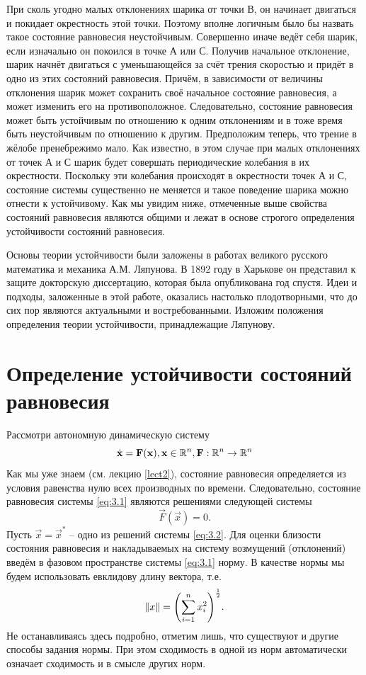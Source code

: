 При сколь угодно малых отклонениях шарика от точки В, он начинает
двигаться и покидает окрестность этой точки. Поэтому вполне логичным было
бы назвать такое состояние равновесия неустойчивым. Совершенно иначе ведёт
себя шарик, если изначально он покоился в точке А или С. Получив начальное
отклонение, шарик начнёт двигаться с уменьшающейся за счёт трения
скоростью и придёт в одно из этих состояний равновесия. Причём, в
зависимости от величины отклонения шарик может сохранить своё начальное
состояние равновесия, а может изменить его на противоположное.
Следовательно, состояние равновесия может быть устойчивым по отношению к
одним отклонениям и в тоже время быть неустойчивым по отношению к
другим. Предположим теперь, что трение в жёлобе пренебрежимо мало. Как
известно, в этом случае при малых отклонениях от точек А и С шарик будет
совершать периодические колебания в их окрестности. Поскольку эти
колебания происходят в окрестности точек А и С, состояние системы
существенно не меняется и такое поведение шарика можно отнести к
устойчивому. Как мы увидим ниже, отмеченные выше свойства состояний
равновесия являются общими и лежат в основе строгого определения
устойчивости состояний равновесия.

Основы теории устойчивости были заложены в работах великого
русского математика и механика А.М. Ляпунова. В 1892 году в Харькове он
представил к защите докторскую диссертацию, которая была опубликована год
спустя. Идеи и подходы, заложенные в этой работе, оказались настолько
плодотворными, что до сих пор являются актуальными и востребованными.
Изложим положения определения теории устойчивости, принадлежащие
Ляпунову.

\section{Определение устойчивости состояний равновесия}%


Рассмотри автономную динамическую систему
\begin{equation}
    \label{eq:3.1}
    \dot {\mathbf{x}} =  \mathbf{F}(\mathbf{x}), \mathbf{x} \in \mathbb{R}^n,   \mathbf{F}: \mathbb{R}^n \rightarrow \mathbb{R}^n
\end{equation}
Как мы уже знаем (см. лекцию \ref{lect2}), состояние равновесия определяется из условия равенства нулю всех производных по времени. Следовательно, состояние равновесия системы \eqref{eq:3.1} являются решениями следующей системы
\begin{equation}
    \label{eq:3.2}
    \vec F(\vec x) = 0 . 
\end{equation}
Пусть $\vec x= \vec x^*$ -- одно из решений системы \eqref{eq:3.2}. Для оценки близости состояния равновесия и накладываемых на систему возмущений (отклонений) введём в фазовом пространстве системы    \eqref{eq:3.1} норму. В качестве нормы мы будем использовать евклидову длину вектора, т.е.
\begin{equation}
    \label{eq:}
    \norm {x}=\qty( \sum\limits_{i=1}^n x_i^2) ^{\frac12}.
\end{equation}
Не останавливаясь здесь подробно, отметим лишь, что существуют и другие способы задания нормы. При этом сходимость в одной из норм автоматически означает сходимость и в смысле других норм.

